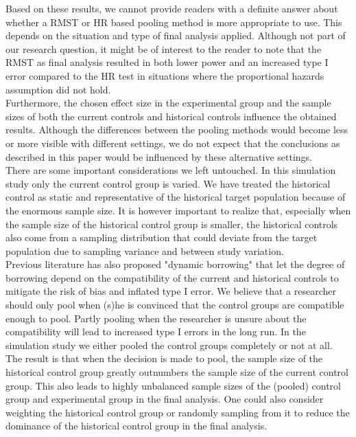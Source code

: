 \documentclass[Royal,sagev,times]{sagej}
\begin{document}
Based on these results, we cannot provide readers with a definite answer about whether a RMST or HR based pooling method is more appropriate to use. This depends on the situation and type of final analysis applied.
Although not part of our research question, it might be of interest to the reader to note that the RMST as final analysis resulted in both lower power and an increased type I error compared to the HR test in situations where the proportional hazards assumption did not hold.
\\

Furthermore, the chosen effect size in the experimental group and the sample sizes of both the current controls and historical controls influence the obtained results. Although the differences between the pooling methods would become less or more visible with different settings, we do not expect that the conclusions as described in this paper would be influenced by these alternative settings.\\

There are some important considerations we left untouched.
In this simulation study only the current control group is varied. We have treated the historical control as static and representative of the historical target population because of the enormous sample size. It is however important to realize that, especially when the sample size of the historical control group is smaller, the historical controls also come from a sampling distribution that could deviate from the target population due to sampling variance and between study variation.\\

Previous literature has also proposed "dynamic borrowing" that let the degree of borrowing depend on the compatibility of the current and historical controls to mitigate the risk of bias and inflated type I error.\cite{viele2014} We believe that a researcher should only pool when (s)he is convinced that the control groups are compatible enough to pool. Partly pooling when the researcher is unsure about the compatibility will lead to increased type I errors in the long run. In the simulation study we either pooled the control groups completely or not at all. The result is that when the decision is made to pool, the sample size of the historical control group greatly outnumbers the sample size of the current control group. This also leads to highly unbalanced sample sizes of the (pooled) control group and experimental group in the final analysis. One could also consider weighting the historical control group or randomly sampling from it to reduce the dominance of the historical control group in the final analysis.\\  
\end{document}
